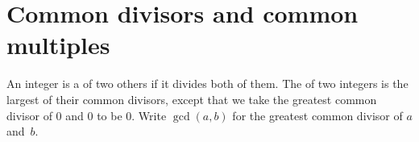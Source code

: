 \documentclass{ibl}  %
\begin{document}
\begin{problem}[\midlength]
\end{problem}







\section{Common divisors and common multiples}

\begin{df}
An integer is a  of two others if it
divides both of them.
The  of two integers 
is the largest of their common divisors,
except that we take the greatest common divisor of $0$ and $0$ 
to be $0$.
Write $\gcd(a,b)$ for the greatest common divisor
of $a$ and~$b$.
\end{df}
\end{document}
